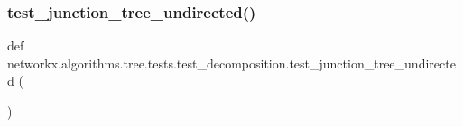 \subsubsection{\texorpdfstring{test\+\_\+junction\+\_\+tree\+\_\+undirected()}{test\_junction\_tree\_undirected()}}
{\footnotesize\ttfamily def networkx.\+algorithms.\+tree.\+tests.\+test\+\_\+decomposition.\+test\+\_\+junction\+\_\+tree\+\_\+undirected (\begin{DoxyParamCaption}{ }\end{DoxyParamCaption})}

